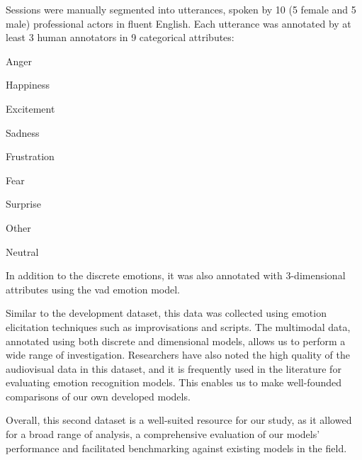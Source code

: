 Sessions were manually segmented into utterances, spoken by 10 (5 female and 5 male) professional actors in fluent English. Each utterance was annotated by at least 3 human annotators in 9 categorical attributes:\\
\begin{enumerate*}[label=$\cdotp$]
	\item Anger
	\item Happiness
	\item Excitement
	\item Sadness
	\item Frustration
	\item Fear
	\item Surprise
	\item Other
	\item Neutral
\end{enumerate*}

In addition to the discrete emotions, it was also annotated with 3-dimensional attributes using the \ac{vad} emotion model.

Similar to the development dataset, this data was collected using emotion elicitation techniques such as improvisations and scripts. The multimodal data, annotated using both discrete and dimensional models, allows us to perform a wide range of investigation. Researchers have also noted the high quality of the audiovisual data in this dataset, and it is frequently used in the literature for evaluating emotion recognition models. This enables us to make well-founded comparisons of our own developed models.

Overall, this second dataset is a well-suited resource for our study, as it allowed for a broad range of analysis, a comprehensive evaluation of our models' performance and facilitated benchmarking against existing models in the field.
